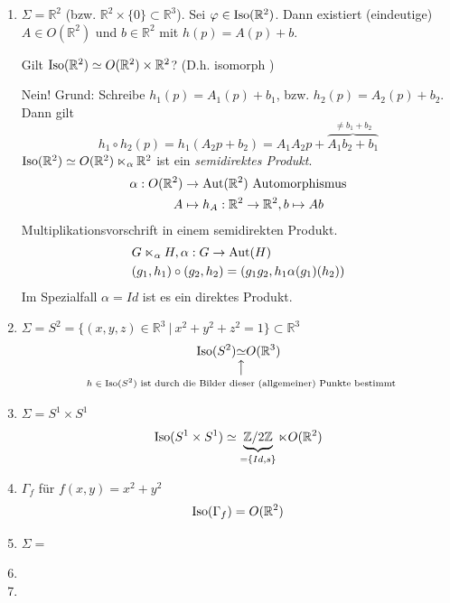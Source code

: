 \documentclass[../main.tex]{subfiles}
\begin{document}
\begin{examples}
    \leavevmode
    \begin{enumerate}
        \item $\Sigma = \mathbb{R}^2$ (bzw. $\mathbb{R}^2 \times \{0\} \subset \mathbb{R}^3$). Sei $\varphi \in \operatorname{Iso}(\mathbb{R}^2)$.
        Dann existiert (eindeutige) $A \in O(\mathbb{R}^2)$ und $b\in \mathbb{R}^2$ mit $h(p)=A(p)+b$.
        \begin{question}
            Gilt $\operatorname{Iso}(\mathbb{R}^2) \simeq O(\mathbb{R}^2) \times \mathbb{R}^2$? (D.h. isomorph )    
        \end{question}
        Nein! Grund: Schreibe $h_{1}(p)=A_1(p)+b_1$, bzw. $h_{2}(p)=A_2(p)+b_2$.
        Dann gilt 
        $$h_1 \circ h_2 (p) = h_1(A_2p+b_2)=A_1A_2p+\overbrace{A_1b_2+b_1}^{\not = b_1+b_2}$$
        $\operatorname{Iso} (\mathbb{R}^2) \simeq O(\mathbb{R}^2) \ltimes_{\alpha} \mathbb{R}^2 $ ist ein \emph{semidirektes Produkt}.
        \begin{align*}
            \alpha : O(\mathbb{R}^2) &\to \operatorname{Aut}(\mathbb{R}^2) \text{ Automorphismus} \\
            A &\mapsto h_A : \mathbb{R}^2 \to \mathbb{R}^2, b \mapsto Ab
        \end{align*}
        Multiplikationsvorschrift in einem semidirekten Produkt.
        \begin{align*}
            &G \ltimes_{\alpha}H, \alpha:G \to \operatorname{Aut}(H) \\
            &(g_1,h_1) \circ (g_2,h_2) = (g_1g_2,h_1\alpha(g_1)(h_2))
        \end{align*}
        Im Spezialfall $\alpha = Id$ ist es ein direktes Produkt.

        \item $\Sigma = S^2 = \{(x,y,z)\in \mathbb{R}^3 \ | \ x^2 + y^2 + z^2 = 1 \} \subset \mathbb{R}^3$
        $$\Iso(S^2) \vertarrowbox[3ex]{\simeq}{$h \in \Iso(S^2)$ ist durch die Bilder dieser (allgemeiner) Punkte bestimmt} O(\mathbb{R}^3)$$

        \item $\Sigma = S^1 \times S^1$
        $$\operatorname{Iso} (S^1\times S^1) \simeq \underbrace{\mathbb{Z}/2\mathbb{Z}}_{=\{Id, s\}} \ltimes O(\mathbb{R}^2)$$
        \item $\Gamma_f $ für $f(x,y)=x^2+y^2$ $$\operatorname{Iso}(\Gamma_f)=O(\mathbb{R}^2)$$
        \item $\Sigma =$
        \item {}
        \item {}
    \end{enumerate}
\end{examples}
\end{document}
